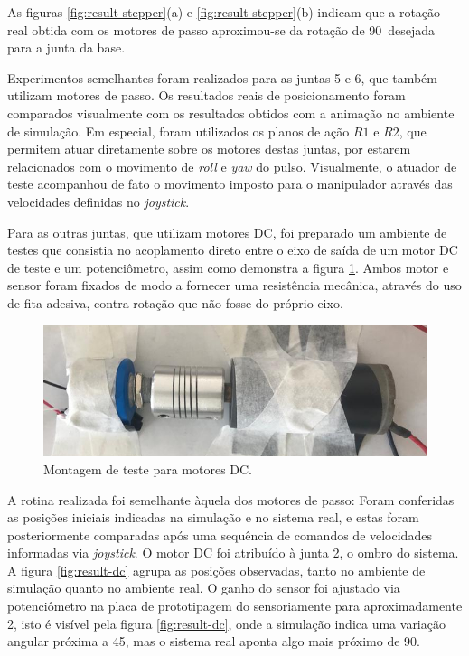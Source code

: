 As figuras \ref{fig:result-stepper}(a) e \ref{fig:result-stepper}(b) indicam que a rotação
real obtida com os motores de passo aproximou-se da rotação de 90\textdegree\, desejada para
a junta da base. 

Experimentos semelhantes foram realizados para as juntas 5 e 6, que também utilizam motores 
de passo. Os resultados reais de posicionamento foram comparados visualmente com os resultados
obtidos com a animação no ambiente de simulação. Em especial, foram utilizados os planos de ação
$R1$ e $R2$, que permitem atuar diretamente sobre os motores destas juntas, por estarem
relacionados com o movimento de \textit{roll} e \textit{yaw} do pulso.
Visualmente, o atuador de teste acompanhou de fato o movimento imposto para o manipulador através das 
velocidades definidas no \textit{joystick}.

Para as outras juntas, que utilizam motores DC, foi preparado um ambiente de testes que consistia
no acoplamento direto entre o eixo de saída de um motor DC de teste e um potenciômetro, assim
como demonstra a figura \ref{fig:teste-dc}. Ambos motor e sensor foram fixados de modo a fornecer
uma resistência mecânica, através do uso de fita adesiva, contra rotação que não fosse do próprio eixo.

\begin{figure}[h!]
    \begin{centering}

    \includegraphics[width=0.8\columnwidth]{images/resultados/teste-dc.jpeg}

\caption{Montagem de teste para motores DC.}
\label{fig:teste-dc}

\par\end{centering}
\end{figure}

A rotina realizada foi semelhante àquela dos motores de passo: Foram conferidas as posições iniciais
indicadas na simulação e no sistema real, e estas foram posteriormente comparadas após uma
sequência de comandos de velocidades informadas via \textit{joystick}. O motor DC foi atribuído à junta 2,
o ombro do sistema. 
A figura \ref{fig:result-dc} agrupa as posições observadas, tanto no ambiente de simulação quanto no ambiente 
real. O ganho do sensor foi ajustado via potenciômetro na placa de prototipagem do sensoriamente para
aproximadamente 2, isto é visível pela figura \ref{fig:result-dc}, onde a simulação indica uma variação
angular próxima a 45\textdegree, mas o sistema real aponta algo mais próximo de 90\textdegree.

